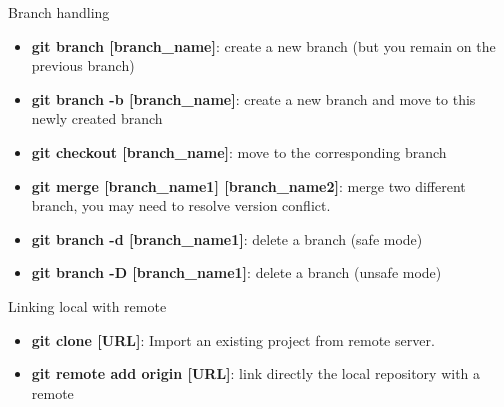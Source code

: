 \documentclass[10pt]{beamer}
\begin{document}
\begin{frame}{Branch handling}
    \begin{itemize}
        \item \textbf{git branch [branch\_name]}: create a new branch (but you remain on the previous branch)
        \item \textbf{git branch -b [branch\_name]}: create a new branch and move to this newly created branch
        \vspace{0.3cm}
        \item \textbf{git checkout [branch\_name]}: move to the corresponding branch
        \vspace{0.3cm}
        \item \textbf{git merge [branch\_name1] [branch\_name2]}: merge two different branch, you may need to resolve version conflict.
        \item \textbf{git branch -d [branch\_name1]}: delete a branch (safe mode)
        \item \textbf{git branch -D [branch\_name1]}: delete a branch (unsafe mode)


    \end{itemize}
\end{frame}


\begin{frame}{Linking local with remote}
    \begin{itemize}
        \item \textbf{git clone [URL]}: Import an existing project from remote server.
        \vspace{0.5cm}
        \item \textbf{git remote add origin [URL]}: link directly the local repository with a remote
    \end{itemize}
\end{frame}
\end{document}
